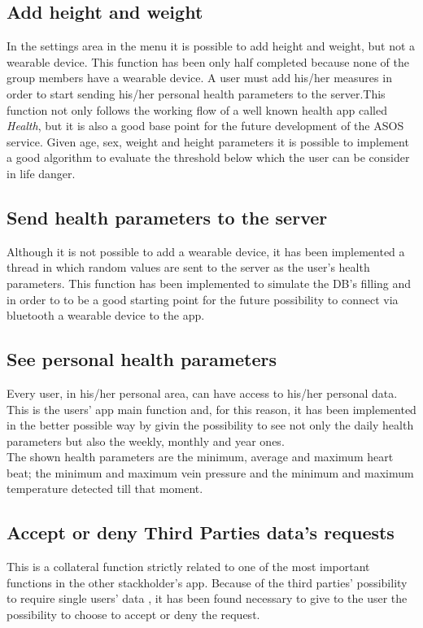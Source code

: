 \subsection{Add height and weight}
In the settings area in the menu it is possible to add height and weight, but not a wearable device. This function has been only half completed because none of the group members have a wearable device. A user must add his/her measures in order to start sending his/her personal health parameters to the server.This function not only follows the working flow of a well known health app called \textit{Health}, but it is also a good base point for the future development of the ASOS service. Given age, sex, weight and height parameters it is possible to implement a good algorithm to evaluate the threshold below which the user can be consider in life danger.

\subsection{Send health parameters to the server}
Although it is not possible to add a wearable device, it has been implemented a thread in which random values are sent to the server as the user's health parameters. This function has been implemented to simulate the DB's filling and in order to to be a good starting point for the future possibility to connect via bluetooth a wearable device to the app.

\subsection{See personal health parameters}
Every user, in his/her personal area, can have access to his/her personal data. This is the users' app main function and, for this reason, it has been implemented in the better possible way by givin the possibility to see not only the daily health parameters but also the weekly, monthly and year ones. \\ The shown health parameters are the minimum, average and maximum heart beat; the minimum and maximum vein pressure and the minimum and maximum temperature detected till that moment.

\subsection{Accept or deny Third Parties data's requests}
This is a collateral function strictly related to one of the most important functions in the other stackholder's app. Because of the third parties' possibility to require single users' data , it has been found necessary to give to the user the possibility to choose to accept or deny the request.

